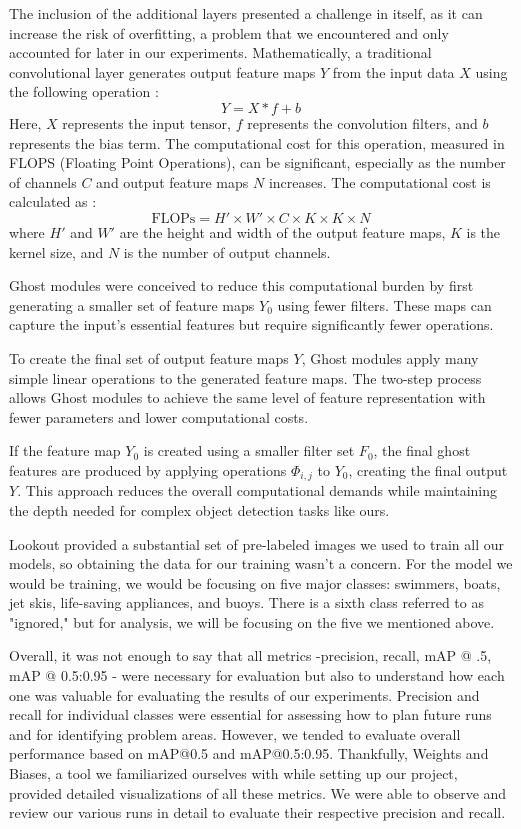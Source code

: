 \documentclass[sigplan,nonacm]{acmart}
\begin{document}
The inclusion of the additional layers presented a challenge in itself, as it can increase the risk of overfitting, a problem that we encountered and only accounted for later in our experiments. Mathematically, a traditional convolutional layer generates output feature maps \( Y \) from the input data \( X \) using the following operation \cite{ghostmodule-paperswithcode}:
\[Y = X \ast f + b\]
Here, \( X \) represents the input tensor, \( f \) represents the convolution filters, and \( b \) represents the bias term. The computational cost for this operation, measured in FLOPS (Floating Point Operations), can be significant, especially as the number of channels \( C \) and output feature maps \( N \) increases. The computational cost is calculated as \cite{ghostmodule-paperswithcode}:
\[
\text{FLOPs} = H' \times W' \times C \times K \times K \times N
\]
where \( H' \) and \( W' \) are the height and width of the output feature maps, \( K \) is the kernel size, and \( N \) is the number of output channels.

Ghost modules were conceived to reduce this computational burden by first generating a smaller set of feature maps \( Y_0 \) using fewer filters. These maps can capture the input's essential features but require significantly fewer operations. 

To create the final set of output feature maps \( Y \), Ghost modules apply many simple linear operations to the generated feature maps. The two-step process allows Ghost modules to achieve the same level of feature representation with fewer parameters and lower computational costs. 

If the feature map \( Y_0 \) is created using a smaller filter set \( F_0 \), the final ghost features are produced by applying operations \( \Phi_{i,j} \) to \( Y_0 \),\cite{ghostmodule-paperswithcode} creating the final output \( Y \). This approach reduces the overall computational demands while maintaining the depth needed for complex object detection tasks like ours.

Lookout provided a substantial set of pre-labeled images we used to train all our models, so obtaining the data for our training wasn't a concern. For the model we would be training, we would be focusing on five major classes: swimmers, boats, jet skis, life-saving appliances, and buoys. There is a sixth class referred to as "ignored," but for analysis, we will be focusing on the five we mentioned above. 

Overall, it was not enough to say that all metrics -precision, recall, mAP @ .5, mAP @ 0.5:0.95 - were necessary for evaluation but also to understand how each one was valuable for evaluating the results of our experiments. Precision and recall for individual classes were essential for assessing how to plan future runs and for identifying problem areas. However,  we tended to evaluate overall performance based on mAP@0.5 and mAP@0.5:0.95. Thankfully, Weights and Biases, a tool we familiarized ourselves with while setting up our project, provided detailed visualizations of all these metrics. We were able to observe and review our various runs in detail to evaluate their respective precision and recall. 
\end{document}
